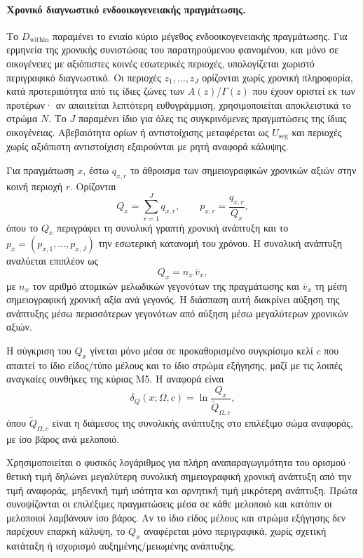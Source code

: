 \documentclass[11pt,a4paper]{article}
\begin{document}
\paragraph{Χρονικό διαγνωστικό ενδοοικογενειακής πραγμάτωσης.}
Το $D_{\mathrm{within}}$ παραμένει το ενιαίο κύριο μέγεθος ενδοοικογενειακής πραγμάτωσης. Για ερμηνεία της χρονικής συνιστώσας του παρατηρούμενου φαινομένου, και μόνο σε οικογένειες με αξιόπιστες κοινές εσωτερικές περιοχές, υπολογίζεται χωριστό περιγραφικό διαγνωστικό. Οι περιοχές $z_1,\ldots,z_J$ ορίζονται χωρίς χρονική πληροφορία, κατά προτεραιότητα από τις ίδιες ζώνες των $A(z)$/$\Gamma(z)$ που έχουν οριστεί εκ των προτέρων· αν απαιτείται λεπτότερη ευθυγράμμιση, χρησιμοποιείται αποκλειστικά το στρώμα $N$. Το $J$ παραμένει ίδιο για όλες τις συγκρινόμενες πραγματώσεις της ίδιας οικογένειας. Αβεβαιότητα ορίων ή αντιστοίχισης μεταφέρεται ως $U_{\mathrm{seg}}$ και περιοχές χωρίς αξιόπιστη αντιστοίχιση εξαιρούνται με ρητή αναφορά κάλυψης.

Για πραγμάτωση $x$, έστω $q_{x,r}$ το άθροισμα των σημειογραφικών χρονικών αξιών στην κοινή περιοχή $r$. Ορίζονται
\[
Q_x=\sum_{r=1}^{J}q_{x,r},
\qquad
p_{x,r}=\frac{q_{x,r}}{Q_x},
\]
όπου το $Q_x$ περιγράφει τη συνολική γραπτή χρονική ανάπτυξη και το $p_x=(p_{x,1},\ldots,p_{x,J})$ την εσωτερική κατανομή του χρόνου. Η συνολική ανάπτυξη αναλύεται επιπλέον ως
\[
Q_x=n_x\,\bar v_x,
\]
με $n_x$ τον αριθμό ατομικών μελωδικών γεγονότων της πραγμάτωσης και $\bar v_x$ τη μέση σημειογραφική χρονική αξία ανά γεγονός. Η διάσπαση αυτή διακρίνει αύξηση της ανάπτυξης μέσω περισσότερων γεγονότων από αύξηση μέσω μεγαλύτερων χρονικών αξιών.

Η σύγκριση του $Q_x$ γίνεται μόνο μέσα σε προκαθορισμένο συγκρίσιμο κελί $c$ που απαιτεί το ίδιο είδος/τύπο μέλους και το ίδιο στρώμα εξήγησης, μαζί με τις λοιπές αναγκαίες συνθήκες της κύριας M5. Η αναφορά είναι
\[
\delta_Q(x;\Omega,c)=\ln\!\frac{Q_x}{\widetilde Q_{\Omega,c}},
\]
όπου $\widetilde Q_{\Omega,c}$ είναι η διάμεσος της συνολικής ανάπτυξης στο επιλέξιμο σώμα αναφοράς, με ίσο βάρος ανά μελοποιό.

Χρησιμοποιείται ο φυσικός λογάριθμος για πλήρη αναπαραγωγιμότητα του ορισμού· θετική τιμή δηλώνει μεγαλύτερη συνολική σημειογραφική χρονική ανάπτυξη από την τιμή αναφοράς, μηδενική τιμή ισότητα και αρνητική τιμή μικρότερη ανάπτυξη. Πρώτα συνοψίζονται οι επιλέξιμες πραγματώσεις μέσα σε κάθε μελοποιό και κατόπιν οι μελοποιοί λαμβάνουν ίσο βάρος. Αν το ίδιο είδος μέλους και στρώμα εξήγησης δεν παρέχουν επαρκή κάλυψη, το $Q_x$ αναφέρεται μόνο περιγραφικά, χωρίς σχετική κατάταξη ή ισχυρισμό αυξημένης/μειωμένης ανάπτυξης.
\end{document}

